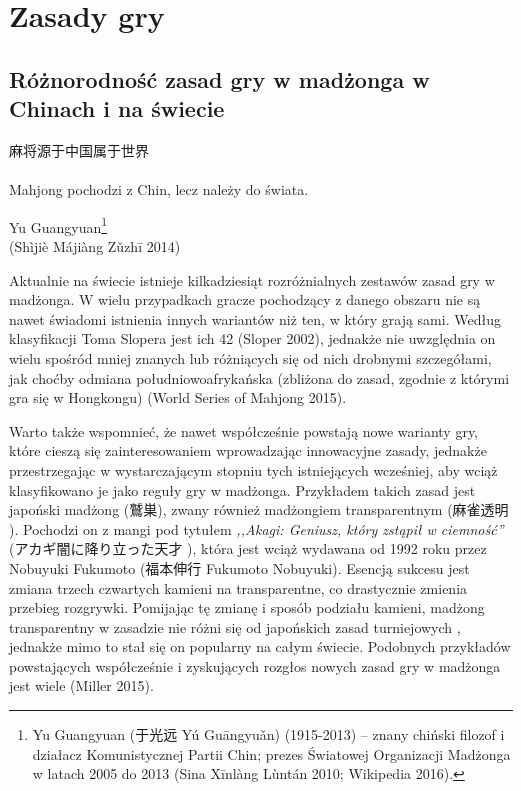 \chapter{Zasady gry}
\section{Różnorodność zasad gry w madżonga w Chinach i na świecie}
\epigraph{麻将源于中国属于世界 \\ 
\footnotesize {} \normalsize \\
Mahjong pochodzi z Chin, lecz
należy do świata.}{Yu Guangyuan\footnote{Yu Guangyuan (于光远 Yú
Guāngyuǎn) (1915-2013) -- znany chiński filozof i działacz Komunistycznej Partii
Chin; prezes Światowej Organizacji Madżonga w latach 2005 do 2013 (Sina
Xīnlàng Lùntán 2010; Wikipedia 2016).}
\\ (Shìjiè Májiàng Zǔzhī 2014)}

Aktualnie na świecie istnieje kilkadziesiąt rozróżnialnych zestawów zasad gry
w madżonga. W wielu przypadkach gracze pochodzący z danego obszaru nie są
nawet świadomi istnienia innych wariantów niż ten, w który grają sami. Według
klasyfikacji Toma Slopera jest ich 42 (Sloper 2002), jednakże nie uwzględnia on
wielu spośród mniej znanych lub różniących się od nich drobnymi szczegółami, jak
choćby odmiana południowoafrykańska (zbliżona do zasad, zgodnie z którymi gra
się w Hongkongu) (World Series of Mahjong 2015).

Warto także wspomnieć, że nawet współcześnie powstają nowe warianty gry, które
cieszą się zainteresowaniem wprowadzając innowacyjne zasady, jednakże przestrzegając w
wystarczającym stopniu tych istniejących wcześniej, aby wciąż klasyfikowano je
jako reguły gry w madżonga. Przykładem takich zasad jest japoński madżong
 (鷲巣), zwany również madżongiem transparentnym (麻雀透明
). Pochodzi on z mangi pod tytułem \textit{,,Akagi:
Geniusz, który zstąpił w ciemność''} (アカギ闇に降り立った天才 ), która jest wciąż wydawana od 1992 roku przez Nobuyuki
Fukumoto (福本伸行 Fukumoto Nobuyuki). Esencją sukcesu  jest zmiana
trzech czwartych kamieni na transparentne, co drastycznie zmienia przebieg
rozgrywki. Pomijając tę zmianę i sposób podziału kamieni, madżong transparentny
w zasadzie nie różni się od japońskich zasad turniejowych ,
jednakże mimo to stał się on popularny na całym świecie. Podobnych przykładów
powstających współcześnie i zyskujących rozgłos nowych zasad gry w madżonga jest
wiele (Miller 2015).

